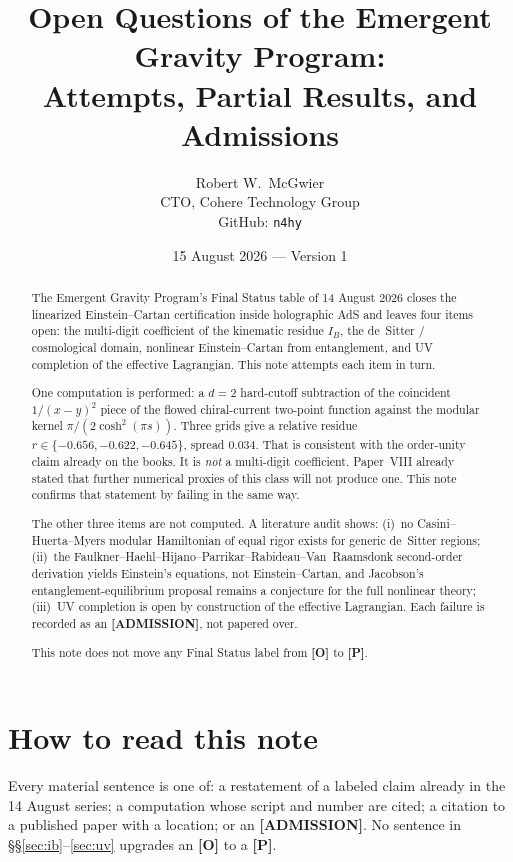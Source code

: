 \documentclass[11pt]{article}
\title{\textbf{Open Questions of the Emergent Gravity Program:\\
Attempts, Partial Results, and Admissions}}
\author{Robert W.\ McGwier\\
\small CTO, Cohere Technology Group\\
\small GitHub: \texttt{n4hy}}
\date{15 August 2026 --- Version 1}
\theoremstyle{definition}
\newcommand{\pP}{\textbf{[P]}}
\newcommand{\pO}{\textbf{[O]}}
\newcommand{\pA}{\textbf{[ADMISSION]}}
\newcommand{\IB}{I_B}
\begin{document}
\maketitle

\begin{abstract}
\noindent
The Emergent Gravity Program's Final Status table of 14 August 2026
closes the linearized Einstein--Cartan certification inside holographic
AdS and leaves four items open: the multi-digit coefficient of the
kinematic residue $\IB$, the de~Sitter / cosmological domain, nonlinear
Einstein--Cartan from entanglement, and UV completion of the effective
Lagrangian. This note attempts each item in turn.

One computation is performed: a $d=2$ hard-cutoff subtraction of the
coincident $1/(x-y)^2$ piece of the flowed chiral-current two-point
function against the modular kernel
$\pi/(2\cosh^2(\pi s))$. Three grids give a relative residue
$r\in\{-0.656,-0.622,-0.645\}$, spread $0.034$. That is consistent
with the order-unity claim already on the books. It is \emph{not} a
multi-digit coefficient. Paper~VIII already stated that further
numerical proxies of this class will not produce one. This note
confirms that statement by failing in the same way.

The other three items are not computed. A literature audit shows:
(i)~no Casini--Huerta--Myers modular Hamiltonian of equal rigor exists
for generic de~Sitter regions; (ii)~the Faulkner--Haehl--Hijano--Parrikar--Rabideau--Van~Raamsdonk
second-order derivation \cite{FHHPRV2017} yields Einstein's equations,
not Einstein--Cartan, and Jacobson's entanglement-equilibrium proposal
\cite{Jacobson2016} remains a conjecture for the full nonlinear theory;
(iii)~UV completion is open by construction of the effective Lagrangian.
Each failure is recorded as an \pA{}, not papered over.

This note does not move any Final Status label from \pO{} to \pP{}.
\end{abstract}

\section*{How to read this note}

Every material sentence is one of: a restatement of a labeled claim
already in the 14 August series; a computation whose script and number
are cited; a citation to a published paper with a location; or an
\pA{}. No sentence in \S\S\ref{sec:ib}--\ref{sec:uv} upgrades an
\pO{} to a \pP{}.
\end{document}
